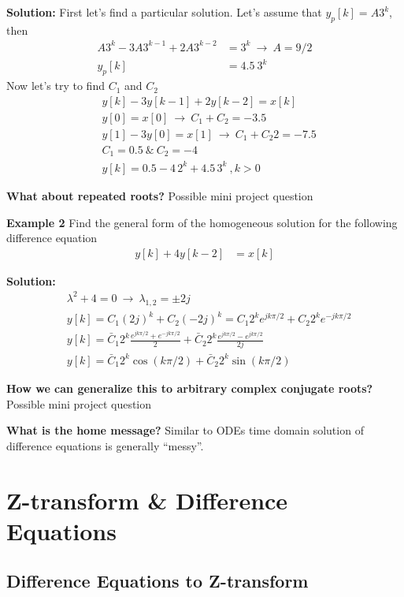 \documentclass[twoside]{article}
\begin{document}
\textbf{Solution:} First let's find a particular solution. 
Let's assume that $y_p[k] = A 3^k$, then
%
\begin{align*}
A 3^k - 3 A 3^{k-1} + 2 A 3^{k-2} &= 3^k \ \rightarrow \ A = 9/2
\\
y_p[k] &= 4.5 \ 3^k
\end{align*}
%
Now let's try to find $C_1$ and $C_2$
%
\begin{align*}
&y[k] - 3 y[k-1] + 2 y[k-2] = x[k]
\\
&y[0] = x[0] \ \rightarrow \ C_1 + C_2 = -3.5 \\
&y[1] - 3 y[0] = x[1] \ \rightarrow \ C_1 + C_2 2 = -7.5
\\
&C_1 = 0.5 \ \& \ C_2 = -4
\\
&y[k] = 0.5 - 4 \, 2^k + 4.5 \, 3^k \ , k > 0 
\end{align*}

\textbf{What about repeated roots?} Possible mini project question


\textbf{Example 2} Find the general form of the homogeneous solution
for the following difference equation
%
\begin{align*}
  y[k] + 4 y[k-2] &= x[k]
\end{align*}

\textbf{Solution:}
%
\begin{align*}
&\lambda^2 + 4 = 0 \ \rightarrow \ \lambda_{1,2} = \pm 2 j
\\
&y[k] = C_1 (2j)^k + C_2 (-2j)^k = C_1 2^k e^{j k \pi/2 } + C_2 2^k e^{-j
k  \pi/2 }  
\\
&y[k] = \bar{C}_1 2^k \frac{ e^{j k \pi/2} + e^{-j k \pi / 2} }{2} +
  \bar{C}_2 2^k \frac{ e^{j k \pi / 2} - e^{j k \pi / 2} }{2 j}
\\
&y[k] = \bar{C}_1 2^k \cos(k \pi /2) + \bar{C}_2 2^k \sin(k \pi /2)
\end{align*}

\textbf{How we can generalize this to arbitrary complex conjugate
  roots?} Possible mini project question

\textbf{What is the home message?} Similar to ODEs time domain
solution of difference equations is generally ``messy''.

\section*{Z-transform \& Difference Equations}

\subsection*{Difference Equations to Z-transform}
\end{document}
